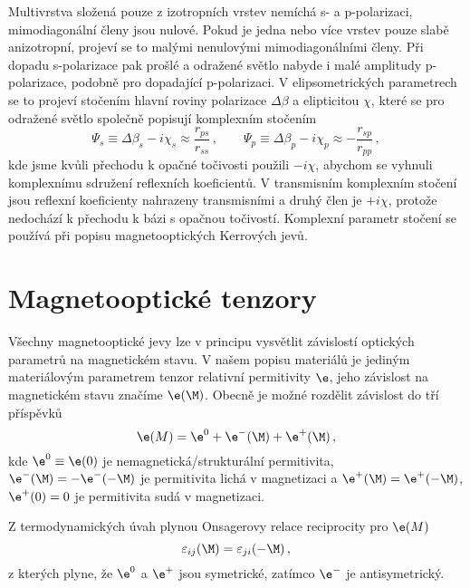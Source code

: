 Multivrstva složená pouze z izotropních vrstev nemíchá s- a p-polarizaci, mimodiagonální členy jsou nulové.
Pokud je jedna nebo více vrstev pouze slabě anizotropní, projeví se to malými nenulovými mimodiagonálními členy.
Při dopadu s-polarizace pak prošlé a odražené světlo nabyde i malé amplitudy p-polarizace, podobně pro dopadající p-polarizaci.
V elipsometrických parametrech se to projeví stočením hlavní roviny polarizace $\Delta \beta$ a elipticitou $\chi$, které se pro odražené světlo společně popisují komplexním stočením \cite{Silber}
\begin{equation}\label{e:komplexni rotace}
\Psi_s \equiv \Delta \beta_s - i \chi_s \approx \frac{r_{ps}}{r_{ss}} \,, \qquad \Psi_p \equiv \Delta \beta_p - i \chi_p \approx -\frac{r_{sp}}{r_{pp}} \,,
\end{equation}
kde jsme kvůli přechodu k opačné točivosti použili $-i\chi$, abychom se vyhnuli komplexnímu sdružení reflexních koeficientů. 
V transmisním komplexním stočení jsou reflexní koeficienty nahrazeny transmisními a druhý člen je $+i\chi$, protože nedochází k přechodu k bázi s opačnou točivostí.
Komplexní parametr stočení se používá při popisu magnetooptických Kerrových jevů.

\section{Magnetooptické tenzory \cite{Visbible}}

Všechny magnetooptické jevy lze v principu vysvětlit závislostí optických parametrů na magnetickém stavu\cite{Silber}.
V našem popisu materiálů je jediným materiálovým parametrem tenzor relativní permitivity $\e$, jeho závislost na magnetickém stavu značíme $\e(\M)$.
Obecně je možné rozdělit závislost do tří příspěvků
\begin{equation}
\e(M)=\e^0 + \e^{-}(\M) + \e^{+}(\M) \,,
\end{equation}
kde $\e^0\equiv \e(0)$ je nemagnetická/strukturální permitivita, $\e^-(\M)=-\e^-(-\M)$ je permitivita lichá v magnetizaci a $\e^+(\M)=\e^+(-\M)$, $\e^+(0)=0$ je permitivita sudá v magnetizaci.

Z termodynamických úvah plynou Onsagerovy relace reciprocity\cite{Onsager} pro $\e(M)$
\begin{equation}
\varepsilon_{ij}(\M)=\varepsilon_{ji}(-\M) \,,
\end{equation}
z kterých plyne, že $\e^0$ a $\e^+$ jsou symetrické, zatímco $\e^-$ je antisymetrický.

